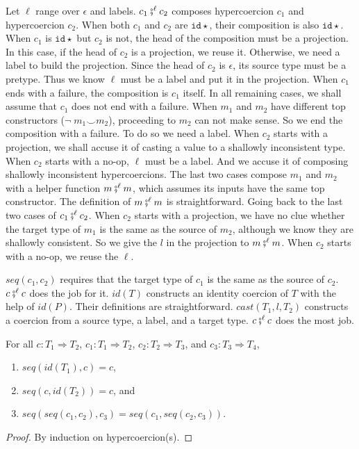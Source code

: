 \documentclass[acmsmall,review,anonymous]{acmart}\settopmatter{printfolios=true,printccs=false,printacmref=false}
\newcommand{\lazyD}{Lazy\;D}
\newcommand{\hyperCoercionI}[0]{\mathtt{id\star}}
\begin{document}
Let $\ell$ range over $\epsilon$ and labels.
$ c_1 \fatsemi^\ell c_2$ composes hypercoercion $c_1$ and hypercoercion $c_2$.
When both $c_1$ and $c_2$ are $\hyperCoercionI$, their 
composition is also $\hyperCoercionI$.
When $c_1$ is $\hyperCoercionI$ but $c_2$ is not, the head of the 
composition must be a projection. In this 
case, if the head of $c_2$ is a projection, we reuse it. Otherwise, we need a 
label to build the projection. Since the head of $c_2$ is $\epsilon$, its 
source type must be a pretype. Thus we know $\ell$ must be a label and put it 
in the projection. 
When $c_1$ ends with a failure, the composition is $c_1$ itself. In all 
remaining cases, we shall assume that $c_1$ does not end with 
a failure.
When $m_1$ and $m_2$ have different top constructors ($\neg\;m_1 \smile 
m_2$), proceeding to $m_2$ can not make sense. So we end the composition 
with a failure. To do so we need a label. When $c_2$ starts with a 
projection, we shall accuse it of casting a value to a shallowly inconsistent 
type. When $c_2$ starts with a no-op, $\ell$ must be a label. And we accuse 
it of composing shallowly inconsistent hypercoercions. The last two cases 
compose $m_1$ and $m_2$ with a helper function $m \fatsemi^\ell m$, which 
assumes its inputs have the same top constructor. The definition of $m 
\fatsemi^\ell m$ is straightforward. Going back to the last two cases of $c_1 
\fatsemi^\ell c_2$. When $c_2$ starts with a projection, we have no clue 
whether the target type of $m_1$ is the same as the source of $m_2$, 
although we know they are shallowly consistent. So we give the $l$ in the 
projection to $m \fatsemi^\ell m$. When $c_2$ starts with a no-op, we reuse 
the $\ell$.

$seq(c_1,c_2)$ requires that the target type of $c_1$ is the same as the 
source of $c_2$. $c \fatsemi^\ell c$ does the job for it.
$id(T)$ constructs an identity coercion of $T$ with the help of $id(P)$. 
Their definitions are straightforward.
$cast(T_1,l,T_2)$ constructs a coercion from a source type, a label, and a 
target type. $c \fatsemi^\ell c$ does the most job.

\begin{proposition}[\lazyD\ hypercoercion is a monoid]
	\label{thm:hc-monoid}
	For all $c : T_1 \Longrightarrow T_2$,
	$c_1 : T_1 \Longrightarrow T_2$,
	$c_2 : T_2 \Longrightarrow T_3$, and
	$c_3 : T_3 \Longrightarrow T_4$,
	\begin{enumerate}
		\item $seq(id(T_1),c) = c$,
		\item $seq(c,id(T_2)) = c$, and
		\item $seq(seq(c_1, c_2), c_3) = seq(c_1, seq(c_2, c_3))$.
	\end{enumerate}
\end{proposition}
\begin{proof}
	By induction on hypercoercion(s).
\end{proof}
\end{document}
